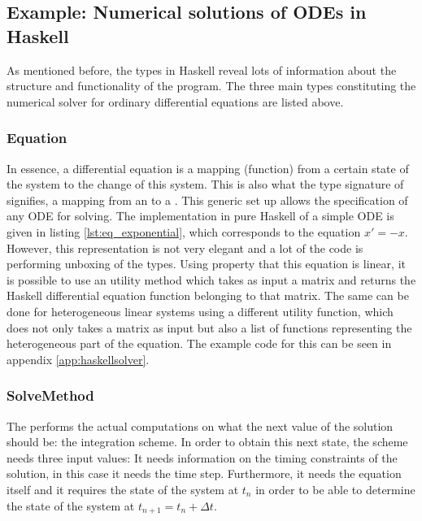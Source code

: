 \subsection{Example: Numerical solutions of ODEs in Haskell}

\lstset{style=haskellStyle}

As mentioned before, the types in Haskell reveal lots of information about the structure and functionality of the program. The three main types constituting the numerical solver for ordinary differential equations are listed above.



\subsubsection{Equation}
In essence, a differential equation is a mapping (function) from a certain state of the system to the change of this system. This is also what the type signature of  signifies, a mapping from an  to a . This generic set up allows the specification of any ODE for solving. The implementation in pure Haskell of a simple ODE is given in listing \ref{lst:eq_exponential}, which corresponds to the equation $x' = -x$. However, this representation is not very elegant and a lot of the code is performing unboxing of the types. Using property that this equation is linear, it is possible to use an utility method which takes as input a matrix and returns the Haskell differential equation function belonging to that matrix. The same can be done for heterogeneous linear systems using a different utility function, which does not only takes a matrix as input but also a list of functions representing the heterogeneous part of the equation. The example code for this can be seen in appendix \ref{app:haskellsolver}.



\subsubsection{SolveMethod}
The  performs the actual computations on what the next value of the solution should be: the integration scheme. In order to obtain this next state, the scheme needs three input values: It needs information on the timing constraints of the solution, in this case it needs the time step. Furthermore, it needs the equation itself and it requires the state of the system at $t_{n}$ in order to be able to determine the state of the system at $t_{n+1} = t_{n} + \Delta t$.

